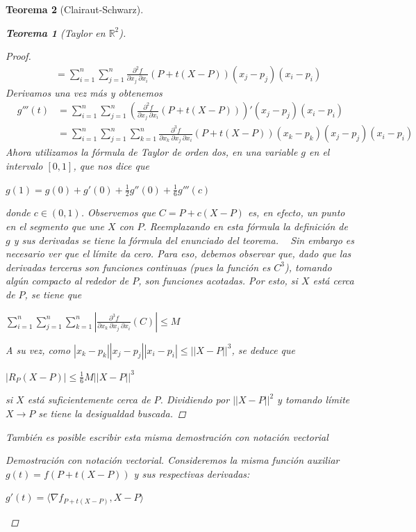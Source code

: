 \documentclass[]{article}
\newtheorem{teo}{Teorema}
\def\R{\mathbb{R}}
\newcommand{\ip}[2]{\langle #1,#2 \rangle}
\newcommand{\dseg}[3]{\frac{\partial^2 #1}{\partial #2\ \partial #3}}
\newcommand{\dter}[4]{\frac{\partial^3 #1}{\partial #2\ \partial #3\ \partial #4}}
\newcommand{\zum}[2]{\sum_{#1}^{#2}}
\begin{document}
\begin{teo}[Clairaut-Schwarz]
\begin{teo}[Taylor en $\R^2$]
\begin{proof}
\begin{eqnarray*}
				& & = \displaystyle \zum{i=1}{n}\zum{j=1}{n}\dseg{f}{x_j}{x_i}(P+t(X-P))(x_j-p_j)(x_i-p_i)
			\end{eqnarray*}
			Derivamos una vez más y obtenemos 
			\begin{eqnarray*}
				& \displaystyle g'''(t) & = \zum{i=1}{n}\zum{j=1}{n}\left(\dseg{f}{x_j}{x_i}(P+t(X-P))\right)'(x_j-p_j)(x_i-p_i)\\
				& & \displaystyle = \zum{i=1}{n}\zum{j=1}{n}\zum{k=1}{n}\dter{f}{x_k}{x_j}{x_i}(P+t(X-P))(x_k-p_k)(x_j-p_j)(x_i-p_i)
			\end{eqnarray*}
			Ahora utilizamos la fórmula de Taylor de orden dos, en una variable $g$ en el intervalo $[0,1]$, que nos dice que
			\begin{center}
				$\displaystyle g(1) = g(0) + g'(0) + \frac{1}{2}g''(0) + \frac{1}{6}g'''(c)$
			\end{center}
			donde $c\in (0,1)$. Observemos que $C=P+c(X-P)$ es, en efecto, un punto en el segmento que une $X$ con $P$. Reemplazando en esta fórmula la definición de $g$ y sus derivadas se tiene la fórmula del enunciado del teorema. 
			~\newline
			Sin embargo es necesario ver que el límite da cero. Para eso, debemos observar que, dado que las derivadas terceras son funciones continuas (pues la función es $C^3$), tomando algún compacto al rededor de $P$, son funciones acotadas. Por esto, si $X$ está cerca de $P$, se tiene que 
			\begin{center}
				$\displaystyle \zum{i=1}{n}\zum{j=1}{n}\zum{k=1}{n} \left| \dter{f}{x_k}{x_j}{x_i}(C)\right| \leq M$
			\end{center}
			A su vez, como $|x_k-p_k||x_j-p_j||x_i-p_i|\leq||X-P||^3$, se deduce que 
			\begin{center}
				$\displaystyle |R_P(X-P)| \leq \frac{1}{6}M||X-P||^3$
			\end{center}
			si $X$ está suficientemente cerca de $P$. Dividiendo por $||X-P||^2$ y tomando límite $X\to P$ se tiene la desigualdad buscada.
		\end{proof}
		También es posible escribir esta misma demostración con notación vectorial
		\begin{proof}[Demostración con notación vectorial]
			Consideremos la misma función auxiliar $g(t) = f(P+t(X-P))$ y sus respectivas derivadas:
			\begin{center}
				$g'(t) = \ip{\nabla f_{P+t(X-P)}}{X-P}$
			\end{center}
			\begin{center}

\end{center}
\end{proof}
\end{teo}
\end{teo}
\end{document}
